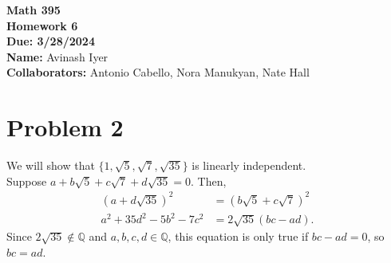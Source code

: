 \documentclass[10pt]{extarticle}
\title{}
\author{}
\date{}
\newcommand{\Q}{\mathbb{Q}}
\begin{document}
  \begin{center}
    {\bf \Large Math 395 \\[0.1in]Homework 6 \\[0.1in]
    Due: 3/28/2024}\\[.25in]
    {\bf Name:} {Avinash Iyer}\\[0.15in]
    {\bf Collaborators:} {Antonio Cabello, Nora Manukyan, Nate Hall} \\
  \end{center}
  \section{Problem 2}%
  We will show that $\{1,\sqrt{5},\sqrt{7},\sqrt{35}\}$ is linearly independent.\\

  Suppose $a + b\sqrt{5} + c\sqrt{7} + d\sqrt{35} = 0$. Then,
  \begin{align*}
    \left(a+d\sqrt{35}\right)^2 &= \left(b\sqrt{5} + c\sqrt{7}\right)^2\\
    a^2 + 35d^2 - 5b^2 - 7c^2 &= 2\sqrt{35}\left(bc-ad\right).
  \end{align*}
  Since $2\sqrt{35}\notin \Q$ and $a,b,c,d\in \Q$, this equation is only true if $bc-ad = 0$, so $bc = ad$.
\end{document}
